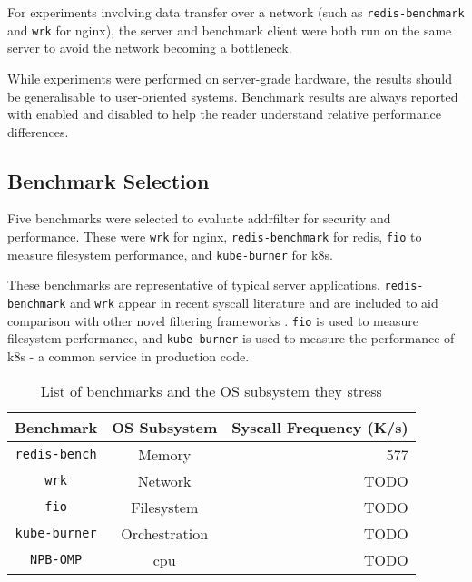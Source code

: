 For experiments involving data transfer over a network (such as
\texttt{redis-benchmark} and \texttt{wrk} for nginx), the server and benchmark
client were both run on the same server to avoid the network becoming a bottleneck.

While experiments were performed on server-grade hardware, the results should be
generalisable to user-oriented systems. Benchmark results are always reported
with \af enabled and disabled to help the reader understand relative
performance differences.

\subsection{Benchmark Selection}


Five benchmarks were selected to evaluate addrfilter for security and
performance. These were \texttt{wrk} for nginx, \texttt{redis-benchmark} for
redis, \texttt{fio} to measure filesystem performance, and \texttt{kube-burner}
for \ac{k8s}. 

These benchmarks are representative of typical server applications.
\texttt{redis-benchmark} and \texttt{wrk} appear in recent syscall literature 
and are included to aid comparison with other novel filtering frameworks 
\cite{OPTIMUS, SYSPART, SYSFILTER}. \texttt{fio} is used to measure filesystem 
performance, and \texttt{kube-burner} is used to measure the performance of \ac{k8s} - 
a common service in production code. 

\begin{table}[H]
    \centering
    \begin{tabular}{ccr}
        \toprule
        Benchmark & OS Subsystem & Syscall Frequency (K/s) \\
        \midrule
        \texttt{redis-bench} & Memory & 577 \\
        \texttt{wrk} & Network & TODO \\
        \texttt{fio} & Filesystem & TODO \\
        \texttt{kube-burner} & Orchestration & TODO \\
        \texttt{NPB-OMP} & \ac{cpu} & TODO \\
    \end{tabular}
    \caption{List of benchmarks and the OS subsystem they
    stress}\label{table:benchmark-selection}
\end{table}


